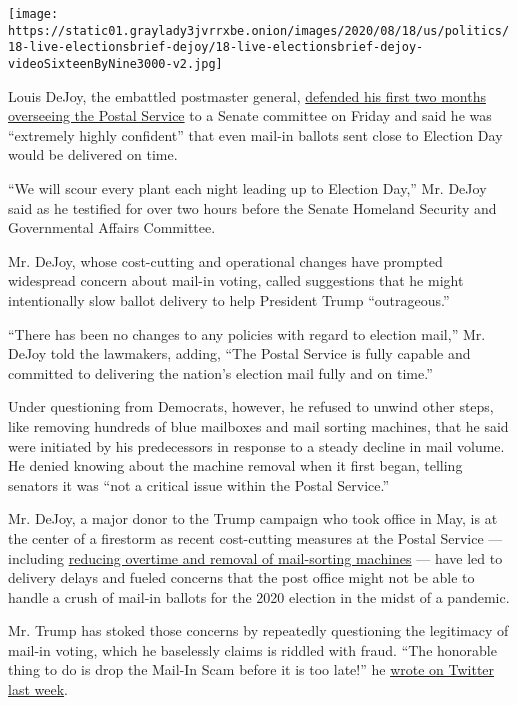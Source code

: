 \texttt{[image: https://static01.graylady3jvrrxbe.onion/images/2020/08/18/us/politics/18-live-electionsbrief-dejoy/18-live-electionsbrief-dejoy-videoSixteenByNine3000-v2.jpg]}

Louis DeJoy, the embattled postmaster general,
\href{https://www.nytimes3xbfgragh.onion/2020/08/21/us/politics/dejoy-postal-service-senate-hearing.html}{defended
his first two months overseeing the Postal Service} to a Senate
committee on Friday and said he was ``extremely highly confident'' that
even mail-in ballots sent close to Election Day would be delivered on
time.

``We will scour every plant each night leading up to Election Day,'' Mr.
DeJoy said as he testified for over two hours before the Senate Homeland
Security and Governmental Affairs Committee.

Mr. DeJoy, whose cost-cutting and operational changes have prompted
widespread concern about mail-in voting, called suggestions that he
might intentionally slow ballot delivery to help President Trump
``outrageous.''

``There has been no changes to any policies with regard to election
mail,'' Mr. DeJoy told the lawmakers, adding, ``The Postal Service is
fully capable and committed to delivering the nation's election mail
fully and on time.''

Under questioning from Democrats, however, he refused to unwind other
steps, like removing hundreds of blue mailboxes and mail sorting
machines, that he said were initiated by his predecessors in response to
a steady decline in mail volume. He denied knowing about the machine
removal when it first began, telling senators it was ``not a critical
issue within the Postal Service.''

Mr. DeJoy, a major donor to the Trump campaign who took office in May,
is at the center of a firestorm as recent cost-cutting measures at the
Postal Service --- including
\href{https://www.nytimes3xbfgragh.onion/2020/08/15/us/post-office-vote-by-mail.html}{reducing
overtime and removal of mail-sorting machines} --- have led to delivery
delays and fueled concerns that the post office might not be able to
handle a crush of mail-in ballots for the 2020 election in the midst of
a pandemic.

Mr. Trump has stoked those concerns by repeatedly questioning the
legitimacy of mail-in voting, which he baselessly claims is riddled with
fraud. ``The honorable thing to do is drop the Mail-In Scam before it is
too late!'' he
\href{https://twitter.com/realdonaldtrump/status/1294731591030378497}{wrote
on Twitter last week}.


